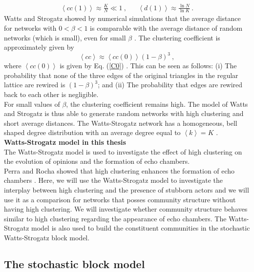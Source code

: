 \documentclass[11 pt , letterpaper , twoside , openright]{book}
\begin{document}
\begin{align}
	\left<cc(1)\right> \approx \frac{K}{N} \ll 1 \ , && \left<d(1)\right> \approx \frac{\ln{N}}{\ln{K}} \ .
\end{align}
Watts and Strogatz showed by numerical simulations that the average distance for networks with $0 < \beta < 1$ is comparable with the average distance of random networks (which is small), even for small $\beta$ \cite{Newman2000}. The clustering coefficient is approximately given by
\begin{equation}
	\left<cc\right> \approx \left<cc(0)\right>(1-\beta)^3 \ ,
\end{equation} 
where $\left<cc(0)\right>$ is given by Eq. (\ref{C0}) \cite{Barrat1999}. This can be seen as follows: (i) The probability that none of the three edges of the original triangles in the regular lattice are rewired is $(1-\beta)^3$; and (ii) The probability that edges are rewired back to each other is negligible.\\
\newline
For small values of $\beta$, the clustering coefficient remains high. The model of Watts and Strogatz is thus able to generate random networks with high clustering and short average distances. The Watts-Strogatz network has a homogeneous, bell shaped degree distribution with an average degree equal to $\left<k\right> = K$ \cite{Barrat1999}.\\
\newline
\textbf{Watts-Strogatz model in this thesis}\\
\newline
The Watts-Strogatz model is used to investigate the effect of high clustering on the evolution of opinions and the formation of echo chambers.\\
\newline
Perra and Rocha showed that high clustering enhances the formation of echo chambers \cite{Perra2019}. Here, we will use the Watts-Strogatz model to investigate the interplay between high clustering and the presence of stubborn actors and we will use it as a comparison for networks that posses community structure without having high clustering. We will investigate whether community structure behaves similar to high clustering regarding the appearance of echo chambers. The Watts-Strogatz model is also used to build the constituent communities in the stochastic Watts-Strogatz block model.

\subsection{The stochastic block model}
\end{document}
